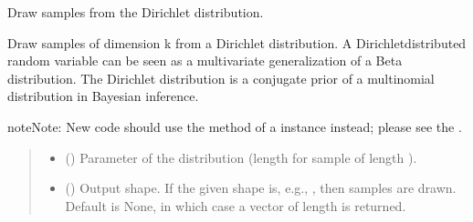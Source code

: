 \documentclass[letterpaper,10pt,english]{sphinxmanual}
\begin{document}
\begin{fulllineitems}
\label{\detokenize{metilda.controllers:metilda.controllers.pitch_art_wizard.dirichlet}}
\pysigstartsignatures
{}
\pysigstopsignatures
\sphinxAtStartPar
Draw samples from the Dirichlet distribution.

\sphinxAtStartPar
Draw  samples of dimension k from a Dirichlet distribution. A
Dirichlet\sphinxhyphen{}distributed random variable can be seen as a multivariate
generalization of a Beta distribution. The Dirichlet distribution
is a conjugate prior of a multinomial distribution in Bayesian
inference.

\begin{sphinxadmonition}{note}{Note:}
\sphinxAtStartPar
New code should use the 
method of a  instance instead;
please see the .
\end{sphinxadmonition}
\begin{quote}\begin{description}
\begin{itemize}
\item {} 
\sphinxAtStartPar
{} (\sphinxstyleliteralemphasis{\sphinxupquote{, }}) \textendash{} Parameter of the distribution (length  for sample of
length ).

\item {} 
\sphinxAtStartPar
{} (\sphinxstyleliteralemphasis{\sphinxupquote{, }}) \textendash{} Output shape.  If the given shape is, e.g., , then
 samples are drawn.  Default is None, in which case a
vector of length  is returned.


\end{itemize}
\end{description}
\end{quote}
\end{fulllineitems}
\end{document}
